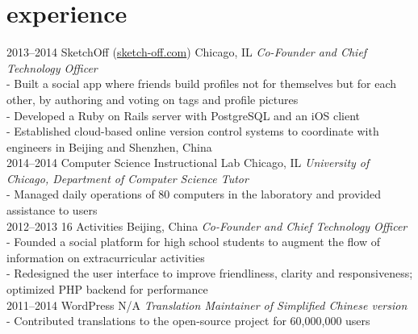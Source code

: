 \documentclass{friggeri-cv} %
\begin{document}

\section{experience}

\begin{entrylist}
\entry
{2013--2014}
{SketchOff \quad\normalfont (\underline{sketch-off.com})}
{Chicago, IL}
{\emph{Co-Founder and Chief Technology Officer} \\
- Built a social app where friends build profiles not for themselves but for each other, by authoring and voting on tags and profile pictures \\
- Developed a Ruby on Rails server with PostgreSQL and an iOS client \\
- Established cloud-based online version control systems to coordinate with engineers in Beijing and Shenzhen, China \\}
\entry
{2014--2014}
{Computer Science Instructional Lab}
{Chicago, IL}
{\emph{University of Chicago, Department of Computer Science Tutor} \\
-   Managed daily operations of 80 computers in the laboratory and provided assistance to users \\}
\entry
{2012--2013}
{16 Activities}
{Beijing, China}
{\emph{Co-Founder and Chief Technology Officer} \\
-   Founded a social platform for high school students to augment the flow of information on extracurricular activities \\
-   Redesigned the user interface to improve friendliness, clarity and responsiveness; optimized PHP backend for performance \\}
\entry
{2011--2014}
{WordPress}
{N/A}
{\emph{Translation Maintainer of Simplified Chinese version} \\
-   Contributed translations to the open-source project for 60,000,000 users \\}

\end{entrylist}

\end{document}
